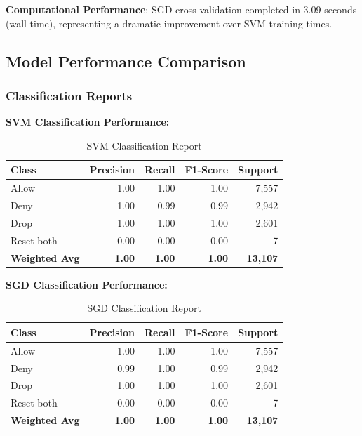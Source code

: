 \documentclass[12pt,a4paper]{article}
\begin{document}
\textbf{Computational Performance}: SGD cross-validation completed in 3.09 seconds (wall time), representing a dramatic improvement over SVM training times.

\subsection{Model Performance Comparison}

\subsubsection{Classification Reports}

\textbf{SVM Classification Performance:}
\begin{table}[H]
\centering
\begin{tabular}{@{}lrrrr@{}}
\toprule
\textbf{Class} & \textbf{Precision} & \textbf{Recall} & \textbf{F1-Score} & \textbf{Support} \\
\midrule
Allow & 1.00 & 1.00 & 1.00 & 7,557 \\
Deny & 1.00 & 0.99 & 0.99 & 2,942 \\
Drop & 1.00 & 1.00 & 1.00 & 2,601 \\
Reset-both & 0.00 & 0.00 & 0.00 & 7 \\
\midrule
\textbf{Weighted Avg} & \textbf{1.00} & \textbf{1.00} & \textbf{1.00} & \textbf{13,107} \\
\bottomrule
\end{tabular}
\caption{SVM Classification Report}
\end{table}

\textbf{SGD Classification Performance:}
\begin{table}[H]
\centering
\begin{tabular}{@{}lrrrr@{}}
\toprule
\textbf{Class} & \textbf{Precision} & \textbf{Recall} & \textbf{F1-Score} & \textbf{Support} \\
\midrule
Allow & 1.00 & 1.00 & 1.00 & 7,557 \\
Deny & 0.99 & 1.00 & 0.99 & 2,942 \\
Drop & 1.00 & 1.00 & 1.00 & 2,601 \\
Reset-both & 0.00 & 0.00 & 0.00 & 7 \\
\midrule
\textbf{Weighted Avg} & \textbf{1.00} & \textbf{1.00} & \textbf{1.00} & \textbf{13,107} \\
\bottomrule
\end{tabular}
\caption{SGD Classification Report}
\end{table}
\end{document}
